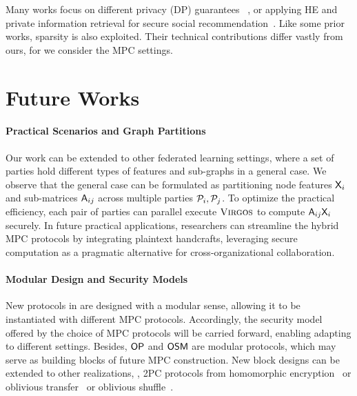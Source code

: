 Many works focus on different privacy (DP) guarantees%
~\cite{tnn/WuPCLZY21,ccs/SajadmaneshG21,pvldb/PatwaSGMR23},
or %
applying HE and private information retrieval for secure social recommendation~\cite{nips/CuiCLYW21}.
Like some prior works, sparsity is also exploited.
Their technical contributions differ vastly from ours, for we consider %
the MPC settings.

\section{Future Works}
\paragraph{Practical Scenarios and Graph Partitions}
\label{sec:future}
Our work can be extended to other federated learning settings, where a set of parties hold different types of features and sub-graphs in a general case.
We observe that the general case can be formulated as partitioning node features \( \mathsf{X}_i \) and sub-matrices \( \mathsf{A}_{ij} \) across multiple parties \( \mathcal{P}_i,\mathcal{P}_j \).
To optimize the practical efficiency, each pair of  parties can parallel execute $\textnormal{\textsc{Virgos}}$ to compute $\mathsf{A}_{ij}\mathsf{X}_{i}$ securely.
In future practical applications, researchers can streamline the hybrid MPC protocols by integrating plaintext handcrafts, %
leveraging secure computation as a pragmatic alternative for cross-organizational collaboration.


\paragraph{Modular Design and Security Models}
 New protocols in \cgnn are designed with a modular sense, allowing it to be instantiated with different MPC protocols. 
 Accordingly, the security model offered by the choice of MPC protocols will be carried forward, enabling \cgnn adapting to different settings.
Besides, $\mathsf{OP}$ and $\mathsf{OSM}$ are modular protocols, which may serve as building blocks of future MPC construction.
New block designs can be extended to other realizations, \eg, 2PC protocols from homomorphic encryption~\cite{eurocrypt/LyubashevskyPR10} or oblivious transfer~\cite{pkc/Tzeng02,ccs/KellerOS16} or oblivious shuffle~\cite{asiacrypt/ChaseGP20,ndss/SongYBDC23}.


